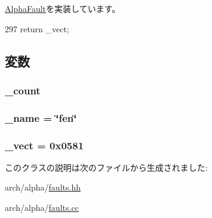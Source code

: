 \hyperlink{classAlphaISA_1_1AlphaFault_ac141ef2ab527bd4d5c079ddff2e8b4aa}{AlphaFault}を実装しています。


\begin{DoxyCode}
297 {return _vect;}
\end{DoxyCode}


\subsection{変数}
\hypertarget{classAlphaISA_1_1FloatEnableFault_a4bff925c412f331c5aaf6a39b79619ff}{
\subsubsection[{\_\-count}]{ {\bf \_\-count}}}
\label{classAlphaISA_1_1FloatEnableFault_a4bff925c412f331c5aaf6a39b79619ff}
\hypertarget{classAlphaISA_1_1FloatEnableFault_ac79073ffcd2c66a09bcd3bd3ad206019}{
\subsubsection[{\_\-name}]{ {\bf \_\-name} = \char`\"{}fen\char`\"{}}}
\label{classAlphaISA_1_1FloatEnableFault_ac79073ffcd2c66a09bcd3bd3ad206019}
\hypertarget{classAlphaISA_1_1FloatEnableFault_ad9e5855b9db0b2824cf6c507be4a872e}{
\subsubsection[{\_\-vect}]{ {\bf \_\-vect} = 0x0581}}
\label{classAlphaISA_1_1FloatEnableFault_ad9e5855b9db0b2824cf6c507be4a872e}


このクラスの説明は次のファイルから生成されました:\begin{DoxyCompactItemize}
\item 
arch/alpha/\hyperlink{arch_2alpha_2faults_8hh}{faults.hh}\item 
arch/alpha/\hyperlink{arch_2alpha_2faults_8cc}{faults.cc}\end{DoxyCompactItemize}
